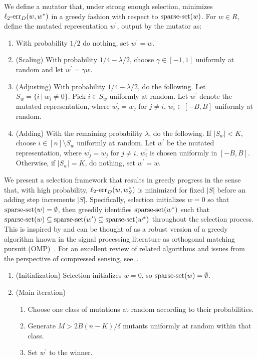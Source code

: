 We define a mutator that, under strong enough selection,
minimizes $\mathrm{\ell_2\mbox{-}err}_D(w, w^*)$ in a greedy fashion with respect to $\mathrm{sparse\mbox{-}set}(w)$.
For $w \in R$, define the mutated representation $w^\prime$, output by the mutator as:
\begin{enumerate}
\item With probability $1/2$ do nothing, set $w^\prime = w$.
\item (Scaling) With probability $1/4 - \lambda/2$, choose $\gamma \in [-1, 1]$
uniformly at random and let $w^\prime = \gamma w$.
\item (Adjusting) With probability $1/4 - \lambda/2$, do the following.
Let $S_w = \{ i~|~ w_i \neq 0\}$. Pick $i \in S_w$ uniformly at random.
Let $w^\prime$ denote the mutated representation, where
$w^\prime_j = w_j$ for $j \neq i$, $w^\prime_i \in [-B, B]$ uniformly at random.
\item (Adding) With the remaining probability $\lambda$, do the following.
If $|S_w| < K$, choose $i \in [n] \setminus S_w$ uniformly at random.
Let $w^\prime$ be the mutated representation, where $w_j^\prime = w_j$ for
$j \neq i$, $w^\prime_i$ is chosen uniformly in $[-B, B]$.
Otherwise, if $|S_w| = K$, do nothing, set $w^\prime = w$.
\end{enumerate}

We present a selection framework that results in greedy progress in the sense
that, with high probability, $\mathrm{\ell_2\mbox{-}err}_D(w, w^*_S)$ is minimized for fixed $|S|$
before an adding step increments $|S|$.
Specifically, selection initializes $w = 0$ so that $\mathrm{sparse\mbox{-}set}(w) = \emptyset$,
then greedily identifies $\mathrm{sparse\mbox{-}set}(w^*)$ such that
$\mathrm{sparse\mbox{-}set}(w) \subseteq \mathrm{sparse\mbox{-}set}(w^\prime) \subseteq \mathrm{sparse\mbox{-}set}(w^*)$
throughout the selection process.
This is inspired by and can be thought of as a robust version of a
greedy algorithm known in the signal processing literature as
orthogonal matching pursuit (OMP)~\cite{Tropp:2004-greed,Donoho:2006-recovery}.
For an excellent review of related algorithms and issues from the perspective
of compressed sensing, see~\cite{Donoho:2009-sparse}.

\begin{enumerate}
\item (Initialization) Selection initializes $w = 0$, so $\mathrm{sparse\mbox{-}set}(w) = \emptyset$.
\item (Main iteration)
	\begin{enumerate}
	\item Choose one class of mutations at random according to their probabilities.
	\item Generate $M > 2B(n - K) / \delta$  mutants uniformly at random within that class.
	\item Set $w^\prime$ to the winner.
	\end{enumerate}
\end{enumerate}

